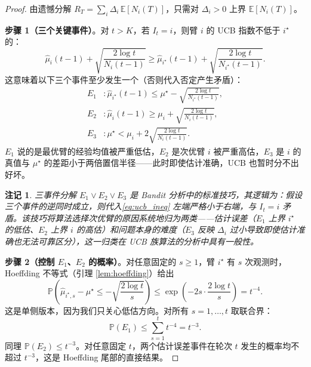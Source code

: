 \documentclass[UTF8,a4paper,11pt,zihao=5]{ctexart}
\newtheorem{remark}[theorem]{注记}
\newcommand{\E}{\mathbb{E}}
\newcommand{\Pbb}{\mathbb{P}}
\newcommand{\regret}[1]{R_{#1}}
\begin{document}
\begin{proof}
由遗憾分解 $\regret{T} = \sum_i \Delta_i \,\E[N_i(T)]$，只需对 $\Delta_i > 0$ 上界 $\E[N_i(T)]$。

\textbf{步骤 1（三个关键事件）}。对 $t > K$，若 $I_t = i$，则臂 $i$ 的 UCB 指数不低于 $i^\star$ 的：
\begin{equation}\label{eq:ucb_ineq}
    \hat{\mu}_i(t-1) + \sqrt{\frac{2 \log t}{N_i(t-1)}} \ge \hat{\mu}_{i^\star}(t-1) + \sqrt{\frac{2 \log t}{N_{i^\star}(t-1)}}.
\end{equation}
这意味着以下三个事件至少发生一个（否则代入否定产生矛盾）：
\begin{align}
    E_1 &: \hat{\mu}_{i^\star}(t-1) \le \mu^\star - \sqrt{\frac{2 \log t}{N_{i^\star}(t-1)}}, \label{eq:e1}\\
    E_2 &: \hat{\mu}_i(t-1) \ge \mu_i + \sqrt{\frac{2 \log t}{N_i(t-1)}}, \label{eq:e2}\\
    E_3 &: \mu^\star < \mu_i + 2\sqrt{\frac{2 \log t}{N_i(t-1)}}. \label{eq:e3}
\end{align}
$E_1$ 说的是最优臂的经验均值被严重低估，$E_2$ 是次优臂 $i$ 被严重高估，$E_3$ 是 $i$ 的真值与 $\mu^\star$ 的差距小于两倍置信半径——此时即使估计准确，UCB 也暂时分不出好坏。

\begin{remark}
三事件分解 $E_1 \lor E_2 \lor E_3$ 是 Bandit 分析中的标准技巧，其逻辑为：假设三个事件的逆同时成立，则代入\eqref{eq:ucb_ineq} 左端严格小于右端，与 $I_t = i$ 矛盾。该技巧将算法选择次优臂的原因系统地归为两类——估计误差（$E_1$ 上界 $i^\star$ 的低估、$E_2$ 上界 $i$ 的高估）和问题本身的难度（$E_3$ 反映 $\Delta_i$ 过小导致即使估计准确也无法可靠区分），这一归类在 UCB 族算法的分析中具有一般性。
\end{remark}

\textbf{步骤 2（控制 $E_1$、$E_2$ 的概率）}。对任意固定的 $s \ge 1$，臂 $i^\star$ 有 $s$ 次观测时，Hoeffding 不等式（引理 \ref{lem:hoeffding}）给出
\begin{equation}
    \Pbb\!\left(\hat{\mu}_{i^\star, s} - \mu^\star \le -\sqrt{\frac{2 \log t}{s}}\right)
    \le \exp\!\left(-2s \cdot \frac{2\log t}{s}\right) = t^{-4}.
\end{equation}
这是单侧版本，因为我们只关心低估方向。对所有 $s = 1, \dots, t$ 取联合界：
\begin{equation}
    \Pbb(E_1) \le \sum_{s=1}^{t} t^{-4} = t^{-3}.
\end{equation}
同理 $\Pbb(E_2) \le t^{-3}$。对任意固定 $t$，两个估计误差事件在轮次 $t$ 发生的概率均不超过 $t^{-3}$，这是 Hoeffding 尾部的直接结果。


\end{proof}
\end{document}
